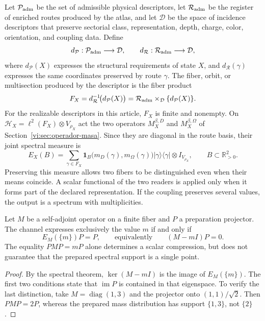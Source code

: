 Let \(\mathcal P_{\rm adm}\) be the set of admissible physical descriptors,
let \(\mathcal R_{\rm adm}\) be the register of enriched routes produced by
the atlas, and let \(\mathcal D\) be the space of incidence descriptors that
preserve sectorial class, representation, depth, charge, color,
orientation, and coupling data. Define
\[
 d_{\mathcal P}:\mathcal P_{\rm adm}\longrightarrow\mathcal D,
 \qquad
 d_{\mathcal R}:\mathcal R_{\rm adm}\longrightarrow\mathcal D,
\]
where \(d_{\mathcal P}(X)\) expresses the structural requirements of state
\(X\), and \(d_{\mathcal R}(\gamma)\) expresses the same coordinates preserved
by route \(\gamma\). The fiber, orbit, or multisection produced by the
descriptor is the fiber product
\begin{equation}
 F_X=d_{\mathcal R}^{-1}\!\bigl(d_{\mathcal P}(X)\bigr)
 =\mathcal R_{\rm adm}\times_{\mathcal D}\{d_{\mathcal P}(X)\}.
 \label{vi:eq:fibra-descriptor}
\end{equation}
For the realizable descriptors in this article, \(F_X\) is finite and nonempty.
On
\(\mathcal H_X=\ell^2(F_X)\otimes V_{\rho_X}\) act the two operators
\(M_X^{\beta,D}\) and \(M_X^{\beta,\Omega}\) of
Section~\ref{vi:sec:operador-masa}. Since they are diagonal in the route
basis, their joint spectral measure is
\begin{equation}
 E_X(B)=\sum_{\gamma\in F_X}
 \mathbf1_B\bigl(m_D(\gamma),m_\Omega(\gamma)\bigr)
 |\gamma\rangle\langle\gamma|\otimes I_{V_{\rho_X}},
 \qquad B\subset\mathbb R_{>0}^2.
 \label{vi:eq:familias-pvm}
\end{equation}
Preserving this measure allows two fibers to be distinguished even when their means
coincide. A scalar functional of the two readers is applied only
when it forms part of the declared representation. If the coupling
preserves several values, the output is a spectrum with multiplicities.

\begin{proposition}
\label{vi:prop:familias-linea}
Let \(M\) be a self-adjoint operator on a finite fiber and \(P\) a
preparation projector. The channel expresses exclusively the value \(m\)
if and only if
\[
 E_M(\{m\})P=P,
 \qquad\text{equivalently}\qquad (M-mI)P=0.
\]
The equality \(PMP=mP\) alone determines a scalar compression,
but does not guarantee that the prepared spectral support is a single point.
\end{proposition}
\begin{proof}
By the spectral theorem, \(\ker(M-mI)\) is the image of
\(E_M(\{m\})\). The first two conditions state that
\(\operatorname{im}P\) is contained in that eigenspace. To verify
the last distinction, take \(M=\operatorname{diag}(1,3)\) and the projector
onto \((1,1)/\sqrt2\). Then \(PMP=2P\), whereas the prepared
mass distribution has support \(\{1,3\}\), not \(\{2\}\).
\end{proof}

